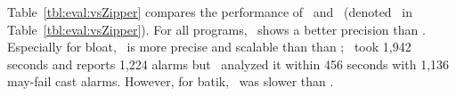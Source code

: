 Table~\ref{tbl:eval:vsZipper} compares the performance of \ours~and \Zipper~(denoted \twoobjZipper~in Table~\ref{tbl:eval:vsZipper}). 
For all programs, \ours~shows a better precision than \Zipper. Especially for bloat, \ours~is more precise and scalable than  than \twoobjZipper; \twoobjZipper~took 1,942 seconds and reports 1,224 alarms but \ours~analyzed it within 456 seconds with 1,136 may-fail cast alarms. However, for batik, \ours~was slower than \twoobjZipper. 


